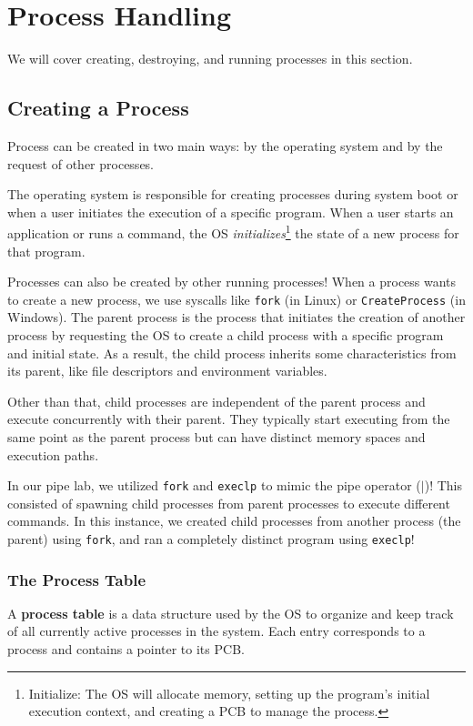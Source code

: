 \documentclass{report}
\newcommand{\definitionBegin}[1]{\begin{tcolorbox}[title={Definition: #1}]}
\newcommand{\definitionEnd}{\end{tcolorbox}}
\newcommand{\exampleBegin}[1]{\begin{tcolorbox}[colback=blue!5!white,colframe=black!75!blue,title={Example:
      #1}]}
\newcommand{\exampleEnd}{\end{tcolorbox}}
\begin{document}
\chapter{Process Handling}
We will cover creating, destroying, and running processes in this section.





\section{Creating a Process}
Process can be created in two main ways: by the operating system and by the request of other
processes.

The operating system is responsible for creating processes during system boot or when a user
initiates the execution of a specific program. When a user starts an application or runs a command,
the OS \textit{initializes}\footnote{Initialize: The OS will allocate memory, setting up the program's
  initial execution context, and creating a PCB to manage the process.} the state of a new process
for that program. 

Processes can also be created by other running processes! When a process wants to create a new
process, we use syscalls like \texttt{fork} (in Linux) or \texttt{CreateProcess} (in Windows). The
parent process is the process that initiates the creation of another process by requesting the OS to
create a child process with a specific program and initial state. As a result, the child process
inherits some characteristics from its parent, like file descriptors and environment variables. 

Other than that, child processes are independent of the parent process and execute concurrently with
their parent. They typically start executing from the same point as the parent process but can have
distinct memory spaces and execution paths. 

\exampleBegin{Pipe Up!}
In our pipe lab, we utilized \texttt{fork} and \texttt{execlp} to mimic the pipe operator ($|$)!
This consisted of spawning child processes from parent processes to execute different commands. In
this instance, we created child processes from another process (the parent) using \texttt{fork}, and
ran a completely distinct program using \texttt{execlp}!
\exampleEnd


\subsection{The Process Table}
\definitionBegin{Process Table}
A \textbf{process table} is a data structure used by the OS to organize and keep track of all
currently active processes in the system. Each entry corresponds to a process and contains a pointer
to its PCB.
\definitionEnd
\end{document}
